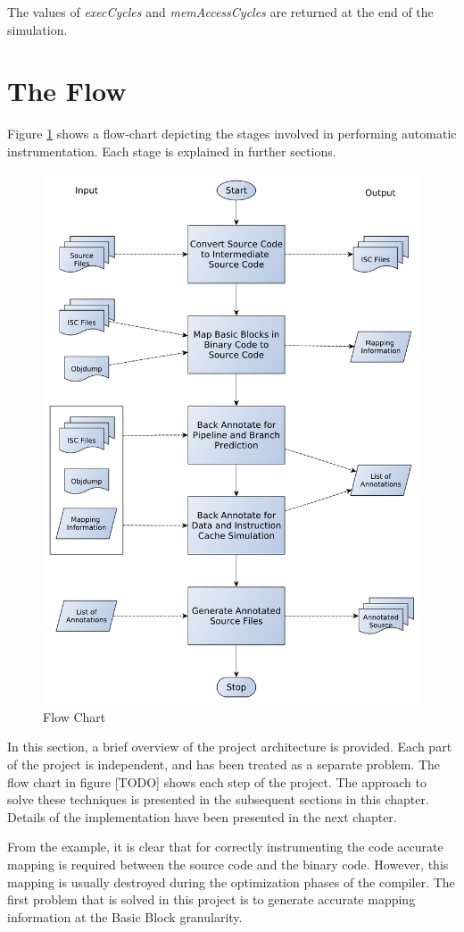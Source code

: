The values of \emph{execCycles} and \emph{memAccessCycles} are returned at the end of the simulation.

\section{The Flow}

Figure \ref{fig:hcsFlowChart} shows a flow-chart depicting the stages involved in performing automatic instrumentation. Each stage is explained in further sections.

\begin{figure}[h]
\center
\includegraphics[width=.78\textwidth]{figures/HCS_FlowChart.pdf}
\caption{Flow Chart}
\label{fig:hcsFlowChart}
\end{figure}


In this section, a brief overview of the project architecture is provided. Each part of the project is independent, and has been treated as a separate problem. The flow chart in figure [TODO] shows each step of the project. The approach to solve these techniques is presented in the subsequent sections in this chapter. Details of the implementation have been presented in the next chapter.

From the example, it is clear that for correctly instrumenting the code accurate mapping is required between the source code and the binary code. However, this mapping is usually destroyed during the optimization phases of the compiler. The first problem that is solved in this project is to generate accurate mapping information at the Basic Block granularity. 

